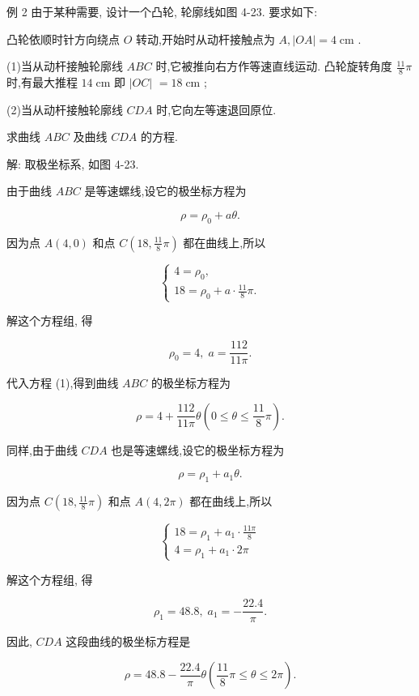 \documentclass[lang=cn,newtx,10pt,scheme=chinese]{elegantbook}
\begin{document}
例 2 由于某种需要, 设计一个凸轮, 轮廓线如图 4-23. 要求如下:

凸轮依顺时针方向绕点 \(O\) 转动,开始时从动杆接触点为 \(A,\left| {OA}\right| = 4\mathrm{\;{cm}}\) .

(1)当从动杆接触轮廓线 \({ABC}\) 时,它被推向右方作等速直线运动. 凸轮旋转角度 \(\frac{11}{8}\pi\) 时,有最大推程 \({14}\mathrm{\;{cm}}\) 即 \(\left| {OC}\right|\) \(= {18}\mathrm{\;{cm}}\) ;

(2)当从动杆接触轮廓线 \({CDA}\) 时,它向左等速退回原位.

求曲线 \({ABC}\) 及曲线 \({CDA}\) 的方程.

解: 取极坐标系, 如图 4-23.

由于曲线 \({ABC}\) 是等速螺线,设它的极坐标方程为

\[
  \rho = {\rho }_{0} + {a\theta }. \tag{1}
\]

因为点 \(A\left( {4,0}\right)\) 和点 \(C\left( {{18},\frac{11}{8}\pi }\right)\) 都在曲线上,所以

\[
  \left\{ \begin{array}{l} 4 = {\rho }_{0}, \\ {18} = {\rho }_{0} + a \cdot \frac{11}{8}\pi . \end{array}\right.
\]

解这个方程组, 得

\[
    {\rho }_{0} = 4,\;a = \frac{112}{11\pi }.
\]

代入方程 (1),得到曲线 \({ABC}\) 的极坐标方程为

\[
  \rho = 4 + \frac{112}{11\pi }\theta \left( {0 \leq \theta \leq \frac{11}{8}\pi }\right) .
\]

同样,由于曲线 \({CDA}\) 也是等速螺线,设它的极坐标方程为

\[
  \rho = {\rho }_{1} + {a}_{1}\theta . \tag{2}
\]

因为点 \(C\left( {{18},\frac{11}{8}\pi }\right)\) 和点 \(A\left( {4,{2\pi }}\right)\) 都在曲线上,所以

\[
  \left\{ \begin{array}{l} {18} = {\rho }_{1} + {a}_{1} \cdot \frac{11\pi }{8} \\ 4 = {\rho }_{1} + {a}_{1} \cdot {2\pi } \end{array}\right.
\]

解这个方程组, 得

\[
    {\rho }_{1} = {48.8},\;{a}_{1} = - \frac{22.4}{\pi }.
\]

因此, \({CDA}\) 这段曲线的极坐标方程是

\[
  \rho = {48.8} - \frac{22.4}{\pi }\theta \left( {\frac{11}{8}\pi \leq \theta \leq {2\pi }}\right) .
\]
\end{document}
